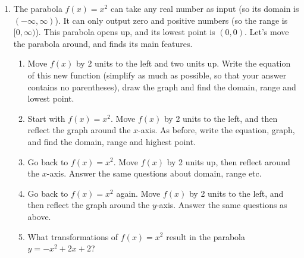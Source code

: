 \documentclass[11pt,dvipsnames]{article}
\begin{document}
\begin{enumerate}[label= {\bf  \arabic*:}]
	\item The parabola $\displaystyle f(x)=x^2$ can take any real number as input (so its domain is $(-\infty,\infty)$). It can only output zero and positive numbers (so the range is $[0,\infty)$). This parabola opens up, and its lowest point is $(0,0)$. Let's move the  parabola around, and finds its main features.

\begin{enumerate}[label=$\hdots$ {\bf  \alph*:}]
\item Move $f(x)$ by 2 units to the left and two units up. Write the equation of this new function  (simplify as much as possible, so that your answer contains no parentheses), draw the graph and find the domain, range and lowest point.
\item  Start with $\displaystyle f(x)=x^2$. Move $f(x)$ by 2 units to the left, and then reflect the graph around the $x$-axis. As before, write the equation, graph, and find the domain, range and highest point.
\item  Go back to $\displaystyle f(x)=x^2$. Move $f(x)$ by 2 units up, then reflect around the $x$-axis. Answer the same questions about domain, range etc.
\item  Go back to $\displaystyle f(x)=x^2$ again.  Move $f(x)$ by 2 units to the left, and then reflect the graph around the $y$-axis. Answer the same questions as above.
\item  What transformations of $\displaystyle f(x)=x^2$ result in the parabola $\displaystyle y=-x^2+2x+2$?
\end{enumerate} 


\end{enumerate}
\end{document}

